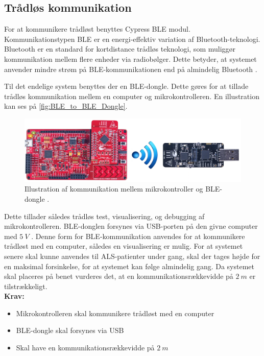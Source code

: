 \subsection{Trådløs kommunikation}\label{sec:traadloes_komm_design}
For at kommunikere trådløst benyttes Cypress BLE modul. Kommunikationstypen BLE \citep{cypressguide2014} er en energi-effektiv variation af Bluetooth-teknologi. 
Bluetooth er en standard for kortdistance trådløs teknologi, som muliggør kommunikation mellem flere enheder via radiobølger. 
Dette betyder, at systemet anvender mindre strøm på BLE-kommunikationen end på almindelig Bluetooth \citep{gupta2013}. 


Til det endelige system benyttes der en BLE-dongle. 
Dette gøres for at tillade trådløs kommunikation mellem en computer og mikrokontrolleren. En illustration kan ses på \autoref{fig:BLE_to_BLE_Dongle}. 

\begin{figure}[H]
	\centering
	\includegraphics[width=1\textwidth]{figures/BLEToBLEdongle}
	\caption{Illustration af kommunikation mellem mikrokontroller og BLE-dongle \citep{cypresspsoc2015, cypressguide2014}.}
	\label{fig:BLE_to_BLE_Dongle}
\end{figure}

\noindent
Dette tillader således trådløs test, visualisering, og debugging af mikrokontrolleren. 
BLE-donglen forsynes via USB-porten på den givne computer med $5~V$ \citep{cypressguide2014}. 
Denne form for BLE-kommunikation anvendes for at kommunikere trådløst med en computer, således en visualisering er mulig. 
For at systemet senere skal kunne anvendes til ALS-patienter under gang, skal der tages højde for en maksimal forsinkelse, for at systemet kan følge almindelig gang. 
Da systemet skal placeres på benet vurderes det, at en kommunikationsrækkevidde på $2~m$ er tilstrækkeligt.
\\

\textbf{Krav:}
\begin{itemize}
\item Mikrokontrolleren skal kommunikere trådløst med en computer
\item BLE-dongle skal forsynes via USB
\item Skal have en kommunikationsrækkevidde på $2~m$
\end{itemize}